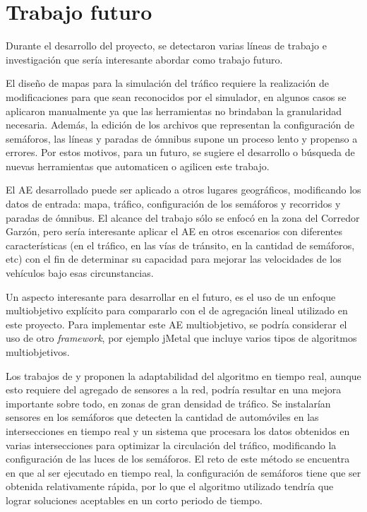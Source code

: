\section{Trabajo futuro}
Durante el desarrollo del proyecto, se detectaron varias líneas de trabajo e investigación que sería interesante abordar como trabajo futuro.

El diseño de mapas para la simulación del tráfico requiere la realización de modificaciones para que sean reconocidos por el simulador, en algunos casos se aplicaron manualmente ya que las herramientas no brindaban la granularidad necesaria. Además, la edición de los archivos que representan la configuración de semáforos, las líneas y paradas de ómnibus supone un proceso lento y propenso a errores. Por estos motivos, para un futuro, se sugiere el desarrollo o búsqueda de nuevas herramientas que automaticen o agilicen este trabajo.

El AE desarrollado puede ser aplicado a otros lugares geográficos, modificando  los datos de entrada: mapa, tráfico, configuración de los semáforos y recorridos y paradas de ómnibus. El alcance del trabajo sólo se enfocó en la zona del Corredor Garzón, pero sería interesante aplicar el AE en otros escenarios con diferentes características (en el tráfico, en las vías de tránsito, en la cantidad de semáforos, etc) con el fin de determinar su capacidad para mejorar las velocidades de los vehículos bajo esas circunstancias.

Un aspecto interesante para desarrollar en el futuro, es el uso de un enfoque multiobjetivo explícito para compararlo con el de agregación lineal utilizado en este proyecto. Para implementar este AE multiobjetivo, se podría considerar el uso de otro \emph{framework}, por ejemplo jMetal que incluye varios tipos de algoritmos multiobjetivos.

Los trabajos de  \citet{Montana1996} y \citet{Vogel2000} proponen la adaptabilidad del algoritmo en tiempo real, aunque esto requiere del agregado de sensores a la red, podría resultar en una mejora importante sobre todo, en zonas de gran densidad de tráfico. Se instalarían sensores en los semáforos que detecten la cantidad de automóviles en las intersecciones en tiempo real y un sistema que procesara los datos obtenidos en varias intersecciones para optimizar la circulación del tráfico, modificando la configuración de las luces de los semáforos. El reto de este método se encuentra en que al ser ejecutado en tiempo real, la configuración de semáforos tiene que ser obtenida relativamente rápida, por lo que el algoritmo utilizado tendría que lograr soluciones aceptables en un corto periodo de tiempo.
